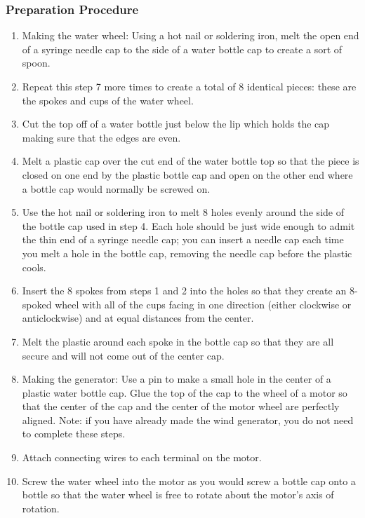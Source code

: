 \subsubsection*{Preparation Procedure}
\begin{enumerate}
\item{Making the water wheel: Using a hot nail or soldering iron, melt the open end of a syringe needle cap to the side of a water bottle cap to create a sort of spoon.} 
\item{Repeat this step 7 more times to create a total of 8 identical pieces: these are the spokes and cups of the water wheel.} 
\item{Cut the top off of a water bottle just below the lip which holds the cap making sure that the edges are even.} 
\item{Melt a plastic cap over the cut end of the water bottle top so that the piece is closed on one end by the plastic bottle cap and open on the other end where a bottle cap would normally be screwed on.} 
\item{Use the hot nail or soldering iron to melt 8 holes evenly around the side of the bottle cap used in step 4. Each hole should be just wide enough to admit the thin end of a syringe needle cap; you can insert a needle cap each time you melt a hole in the bottle cap, removing the needle cap before the plastic cools.} 
\item{Insert the 8 spokes from steps 1 and 2 into the holes so that they create an 8-spoked wheel with all of the cups facing in one direction (either clockwise or anticlockwise) and at equal distances from the center.} 
\item{Melt the plastic around each spoke in the bottle cap so that they are all secure and will not come out of the center cap.} 
\item{Making the generator: Use a pin to make a small hole in the center of a plastic water bottle cap. Glue the top of the cap to the wheel of a motor so that the center of the cap and the center of the motor wheel are perfectly aligned. Note: if you have already made the wind generator, you do not need to complete these steps.} 
\item{Attach connecting wires to each terminal on the motor.} 
\item{Screw the water wheel into the motor as you would screw a bottle cap onto a bottle so that the water wheel is free to rotate about the motor's axis of rotation.} 
\end{enumerate}

